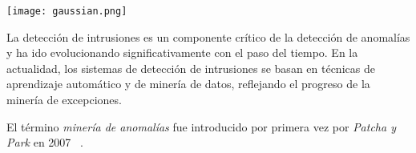 \noindent
\begin{minipage}{\linewidth}
	\centering
	\texttt{[image: gaussian.png]}
	\label{fig:fig1}
\end{minipage}
\vspace{1\baselineskip}

La detección de intrusiones es un componente crítico de la detección de anomalías y ha ido evolucionando
significativamente con el paso del tiempo. En la actualidad, los sistemas de detección de intrusiones
se basan en técnicas de aprendizaje automático y de minería de datos, reflejando el progreso de la minería
de excepciones.

El término \textit{minería de anomalías} fue introducido por primera vez por \textit{Patcha y Park} en 2007
~\cite{patcha2007overview}.
